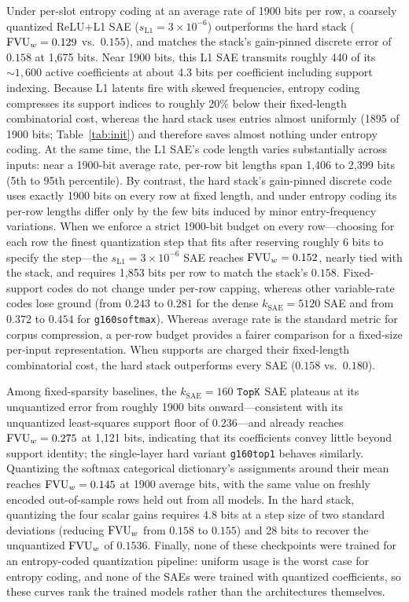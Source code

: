 Under per-slot entropy coding at an average rate of 1900 bits per row, a
coarsely quantized ReLU+L1 SAE ($s_{\mathrm{L1}}{=}3\times10^{-6}$)
outperforms the hard stack ($\mathrm{FVU}_w = 0.129$ vs.\ $0.155$), and matches the
stack's gain-pinned discrete error of $0.158$ at 1{,}675 bits. Near 1900
bits, this L1 SAE transmits roughly 440 of its ${\sim}1{,}600$ active
coefficients at about 4.3 bits per coefficient including support indexing.
Because L1 latents fire with skewed frequencies, entropy coding compresses
its support indices to roughly 20\% below their fixed-length combinatorial
cost, whereas the hard stack uses entries almost uniformly (1895 of 1900
bits; Table~\ref{tab:init}) and therefore saves almost nothing under
entropy coding. At the same time, the L1 SAE's code length varies
substantially across inputs: near a 1900-bit average rate, per-row bit
lengths span 1{,}406 to 2{,}399 bits (5th to 95th percentile). By
contrast, the hard stack's gain-pinned discrete code uses exactly 1900
bits on every row at fixed length, and under entropy coding its per-row
lengths differ only by the few bits induced by minor entry-frequency
variations. When we enforce a strict 1900-bit budget on every row---choosing
for each row the finest quantization step that fits after reserving
roughly 6 bits to specify the step---the $s_{\mathrm{L1}}{=}3\times10^{-6}$
SAE reaches $\mathrm{FVU}_w = 0.152$, nearly tied with the stack, and requires
1{,}853 bits per row to match the stack's $0.158$. Fixed-support codes do
not change under per-row capping, whereas other variable-rate codes lose
ground (from $0.243$ to $0.281$ for the dense $k_{\mathrm{SAE}}{=}5120$
SAE and from $0.372$ to $0.454$ for \texttt{g160softmax}). Whereas average
rate is the standard metric for corpus compression, a per-row budget
provides a fairer comparison for a fixed-size per-input representation.
When supports are charged their fixed-length combinatorial cost, the hard
stack outperforms every SAE ($0.158$ vs.\ $0.180$).

Among fixed-sparsity baselines, the $k_{\mathrm{SAE}}{=}160$ $\mathop{\mathtt{TopK}}\limits$ SAE
plateaus at its unquantized error from roughly 1900 bits onward---consistent
with its unquantized least-squares support floor of $0.236$---and already
reaches $\mathrm{FVU}_w = 0.275$ at 1{,}121 bits, indicating that its coefficients
convey little beyond support identity; the single-layer hard variant
\texttt{g160top1} behaves similarly. Quantizing the softmax categorical
dictionary's assignments around their mean reaches $\mathrm{FVU}_w = 0.145$ at 1900
average bits,
with the same value on freshly encoded out-of-sample rows held out from
all models. In the hard stack, quantizing the four scalar gains requires 4.8
bits at a step size of two standard deviations (reducing $\mathrm{FVU}_w$ from
$0.158$ to $0.155$) and 28 bits to recover the unquantized $\mathrm{FVU}_w$ of
$0.1536$. Finally, none of these checkpoints were trained for an
entropy-coded quantization pipeline: uniform usage is the worst case for
entropy coding, and none of the SAEs were trained with quantized
coefficients, so these curves rank the trained models rather than the
architectures themselves.

